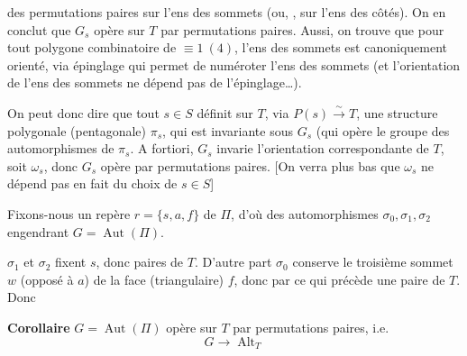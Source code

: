 \documentclass[11pt,a4paper]{article}
\begin{document}

 des permutations paires sur l'ens des sommets (ou,
\ill{}, sur l'ens des côtés).  On en conclut que  $G_s$ opère
 sur
$T$ par permutations paires. Aussi, on trouve que pour tout polygone
combinatoire de  $\equiv 1 \ (4)$, l'ens des sommets est
canoniquement orienté, via épinglage qui permet de numéroter
l'ens des sommets (et l'orientation de l'ens des sommets ne
dépend pas de l'épinglage…).

On peut donc dire que tout $s \in S$ définit sur $T$, via
$P(s) \xrightarrow{\sim} T$, une structure polygonale (pentagonale)
$\pi_s$, qui est invariante sous $G_s$ (qui opère 
le groupe des automorphismes de $\pi_s$. A fortiori, $G_s$
invarie l'orientation correspondante de $T$, soit $\omega_s$, donc $G_s$
opère par permutations paires. [On verra plus bas que
$\omega_s$ ne dépend pas en fait du choix de $s \in S$]

Fixons-nous un repère $r = \{s, a, f\}$ de $\Pi$, d'où des automorphismes
$\sigma_0, \sigma_1, \sigma_2$ engendrant $G = \operatorname{Aut}(\Pi)$.


$\sigma_1$ et $\sigma_2$ fixent $s$, donc   paires de $T$. D'autre part
$\sigma_0$ conserve le troisième sommet $w$ (opposé à $a$) de la face
(triangulaire) $f$, donc par ce qui précède 
  une  paire de $T$. Donc

\textbf{Corollaire} $G = \operatorname{Aut}(\Pi)$ opère sur $T$ par
permutations paires, i.e.\ 
\[
  G \longrightarrow \operatorname{Alt}_T
\]
\end{document}
